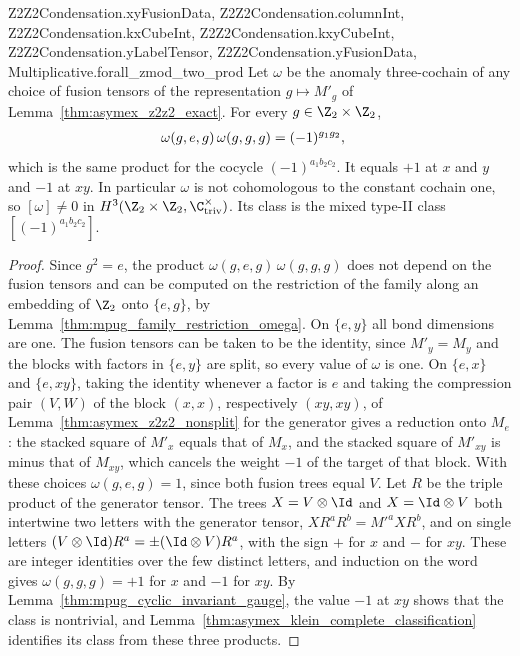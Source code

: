 \begin{lemma}
{        Z2Z2Condensation.xyFusionData,
        Z2Z2Condensation.columnInt,
        Z2Z2Condensation.kxCubeInt,
        Z2Z2Condensation.kxyCubeInt,
        Z2Z2Condensation.yLabelTensor,
        Z2Z2Condensation.yFusionData,
        Multiplicative.forall_zmod_two_prod}
    \leanok
    Let $\omega$ be the anomaly three-cochain of any choice of fusion
    tensors of the representation $g\mapsto M'_g$ of
    Lemma~\ref{thm:asymex_z2z2_exact}. For every
    $g\in\Z_2\times\Z_2$,
    \begin{align}
        \omega(g,e,g)\,\omega(g,g,g)
         & =(-1)^{g_1g_2},
        \notag
    \end{align}
    which is the same product for the cocycle $(-1)^{a_1b_2c_2}$. It equals
    $+1$ at $x$ and $y$ and $-1$ at $xy$. In particular $\omega$ is not
    cohomologous to the constant cochain one, so
    $[\omega]\neq0$ in $H^3(\Z_2\times\Z_2,\C^\times_{\mathrm{triv}})$.
    Its class is the mixed type-II
    class $[(-1)^{a_1b_2c_2}]$.
\end{lemma}

\begin{proof}
    \leanok
    Since $g^2=e$, the product $\omega(g,e,g)\,\omega(g,g,g)$ does not
    depend on the fusion tensors and can be computed on the restriction of
    the family along an embedding of $\Z_2$ onto $\{e,g\}$, by
    Lemma~\ref{thm:mpug_family_restriction_omega}. On $\{e,y\}$ all bond
    dimensions are one. The fusion tensors can be taken to be the identity,
    since $M'_y=M_y$ and the blocks with factors in $\{e,y\}$ are split, so
    every value of $\omega$ is one. On $\{e,x\}$ and $\{e,xy\}$, taking the
    identity whenever a factor is $e$ and taking the compression pair
    $(V,W)$ of the block $(x,x)$, respectively $(xy,xy)$, of
    Lemma~\ref{thm:asymex_z2z2_nonsplit} for the generator gives a
    reduction onto $M_e$: the stacked square of $M'_x$ equals that of $M_x$,
    and the stacked square of $M'_{xy}$ is minus that of $M_{xy}$, which
    cancels the weight $-1$ of the target of that block. With these choices
    $\omega(g,e,g)=1$, since both fusion trees equal $V$. Let $R$ be the
    triple product of the generator tensor. The trees $X=V\otimes\Id$ and
    $X=\Id\otimes V$ both intertwine two letters with the generator tensor,
    $XR^aR^b=M'^aXR^b$, and on single letters
    $(V\otimes\Id)R^a=\pm(\Id\otimes V)R^a$, with the sign $+$ for $x$ and
    $-$ for $xy$. These are integer identities over the few distinct
    letters, and induction on the word gives $\omega(g,g,g)=+1$ for $x$
    and $-1$ for $xy$. By Lemma~\ref{thm:mpug_cyclic_invariant_gauge}, the
    value $-1$ at $xy$ shows that the class is nontrivial, and
    Lemma~\ref{thm:asymex_klein_complete_classification} identifies its
    class from these three products.
\end{proof}


